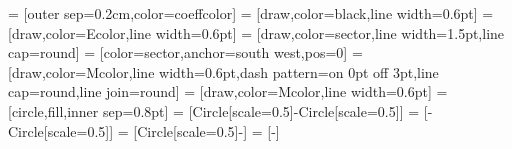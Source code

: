 \newcommand\intersoffs{0.1} %
\newcommand\pathoffs{0.3} %
\newcommand\lineoffs{0.05} %
\newcommand\selfoffsouter{0.1} %
\newcommand\selfoffsinner{0.05} %
\newcommand\edgeext{0.4} %

 = [outer sep=0.2cm,color=coeffcolor]
 = [draw,color=black,line width=0.6pt]
 = [draw,color=Ecolor,line width=0.6pt]
 = [draw,color=sector,line width=1.5pt,line cap=round]
 = [color=sector,anchor=south west,pos=0]
 = [draw,color=Mcolor,line width=0.6pt,dash pattern=on 0pt off 3pt,line cap=round,line join=round]
 = [draw,color=Mcolor,line width=0.6pt]
 = [circle,fill,inner sep=0.8pt]
 = [{Circle[scale=0.5]}-{Circle[scale=0.5]}]
 = [-{Circle[scale=0.5]}]
 = [{Circle[scale=0.5]}-]
 = [-]
